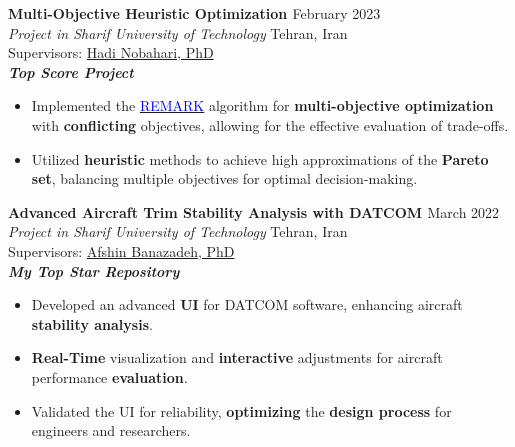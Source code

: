 \documentclass[12pt]{article}
\begin{document}
\vspace{0.2in}
\noindent
{\bfseries Multi-Objective Heuristic Optimization
\href{https://github.com/alibaniasad1999/Heuristic-optimization-algorithms}{\faGithub}
}
\hfill February 2023 \\ 
\noindent \textit{Project in Sharif University of Technology} \hfill Tehran, Iran \\
\noindent Supervisors: 
\href{https://ae.sharif.edu/~portal/faculty/1091235256}{Hadi Nobahari, PhD}\\ 
{\footnotesize \textbf{\textit{Top Score Project \faMedal}}}
\begin{itemize} \itemsep -1pt %
    \item Implemented the \href{https://link.springer.com/article/10.1007/s12652-022-04332-8}{\textcolor{blue}{REMARK}} algorithm for \textbf{multi-objective optimization} with \textbf{conflicting} objectives, allowing for the effective evaluation of trade-offs.
    \item Utilized \textbf{heuristic} methods to achieve high approximations of the \textbf{Pareto set}, balancing multiple objectives for optimal decision-making.
\end{itemize}

\vspace{0.2in}
\noindent
{\bfseries Advanced Aircraft Trim Stability Analysis with DATCOM
\href{https://github.com/alibaniasad1999/DATCOM-Trim-Diagram-GUI}{\faGithub}
}
\hfill March 2022 \\ 
\noindent \textit{Project in Sharif University of Technology} \hfill Tehran, Iran \\ 
\noindent Supervisors: 
\href{http://ae.sharif.edu/~portal/faculty/1014037799}{Afshin Banazadeh, PhD}\\
{\footnotesize \textbf{\textit{My Top Star Repository \faStar}}} 
\begin{itemize} \itemsep -1pt %
    \item Developed an advanced \textbf{UI} for DATCOM software, enhancing aircraft  \textbf{stability analysis}.
    \item  \textbf{Real-Time} visualization and \textbf{interactive} adjustments for aircraft performance \textbf{evaluation}.
    \item Validated the UI for reliability, \textbf{optimizing} the \textbf{design process} for engineers and researchers.
\end{itemize}
\end{document}
